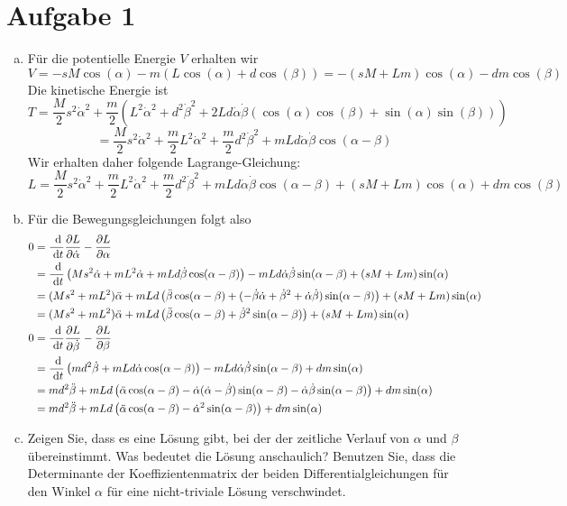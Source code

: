 \documentclass{article}
\theoremstyle{definition}
\begin{document}
\section*{Aufgabe 1}
\begin{enumerate}[(a)]
    \item Für die potentielle Energie $V$ erhalten wir
    $$V  = -s M \cos(\alpha) - m (L \cos(\alpha) + d\cos(\beta)) = -(sM + Lm)\cos(\alpha) - dm\cos(\beta)$$
    Die kinetische Energie ist
    $$T = \frac{M}{2}s^2\dot \alpha^2 + \frac{m}{2}\left(L^2\dot \alpha^2 + d^2\dot \beta^2 + 2Ld\dot \alpha\dot \beta (\cos(\alpha)\cos(\beta) + \sin(\alpha)\sin(\beta))\right)$$
    $$= \frac{M}{2}s^2\dot \alpha^2 + \frac{m}{2}L^2 \dot \alpha^2 + \frac{m}{2}d^2 \dot \beta^2 + mLd\dot \alpha\dot \beta \cos(\alpha - \beta)$$
    Wir erhalten daher folgende Lagrange-Gleichung:
    $$L = \frac{M}{2}s^2\dot \alpha^2 + \frac{m}{2}L^2 \dot \alpha^2 + \frac{m}{2}d^2 \dot \beta^2 + mLd\dot \alpha\dot \beta \cos(\alpha - \beta)+(sM + Lm)\cos(\alpha) + dm\cos(\beta)$$
    \item Für die Bewegungsgleichungen folgt also
    \begin{align*}
        0 &= \frac{\d }{\d t}\frac{\partial L }{\partial \dot \alpha} - \frac{\partial L}{\partial \alpha}\\
        &= \frac{\d }{\d t} \left(Ms^2 \dot \alpha + mL^2 \dot \alpha + mLd\dot \beta \cos(\alpha - \beta)\right) - mLd\dot \alpha\dot \beta \sin(\alpha - \beta)+ (sM + Lm)\sin(\alpha)\\
        &= (Ms^2 + mL^2)\ddot \alpha + mLd\left(\ddot \beta\cos(\alpha - \beta) + (- \dot \beta \dot \alpha + \dot \beta^2+ \dot\alpha \dot \beta) \sin(\alpha - \beta)\right)+ (sM + Lm)\sin(\alpha)\\
        &= (Ms^2 + mL^2)\ddot \alpha + mLd\left(\ddot \beta\cos(\alpha - \beta) + \dot \beta^2 \sin(\alpha - \beta)\right)+ (sM + Lm)\sin(\alpha)\\
        0 &= \frac{\d }{\d t}\frac{\partial L }{\partial \dot \beta} - \frac{\partial L}{\partial \beta}\\
        &= \frac{\d }{\d t} \left(md^2\dot \beta + mLd\dot \alpha \cos(\alpha - \beta)\right) - mLd\dot \alpha\dot \beta \sin(\alpha - \beta) + dm\sin(\alpha)\\
        &= md^2 \ddot \beta + mLd\left(\ddot \alpha \cos(\alpha - \beta) - \dot \alpha (\dot \alpha - \dot \beta)\sin(\alpha - \beta) - \dot \alpha \dot \beta \sin(\alpha - \beta)\right)+ dm\sin(\alpha)\\
        &= md^2 \ddot \beta + mLd\left(\ddot \alpha \cos(\alpha - \beta) - \dot \alpha^2 \sin(\alpha - \beta)\right)+ dm\sin(\alpha)\\
    \end{align*}
    \item Zeigen Sie, dass es eine Lösung gibt, bei der der zeitliche Verlauf von $\alpha$ und $\beta$ übereinstimmt.
    Was bedeutet die Lösung anschaulich? Benutzen Sie, dass die Determinante der Koeffizientenmatrix der beiden Differentialgleichungen für den Winkel $\alpha$ für eine nicht-triviale Lösung verschwindet.
\end{enumerate}
\end{document}
